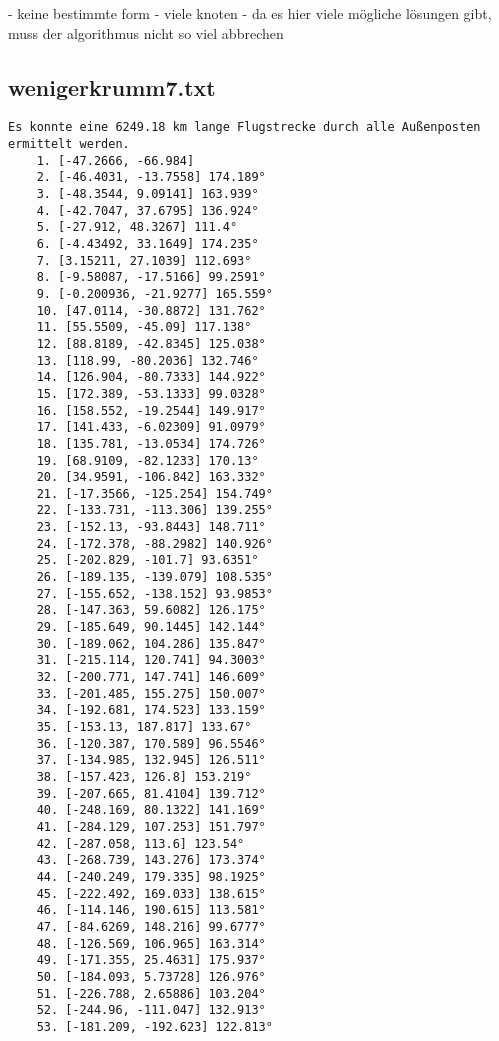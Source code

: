 \documentclass[a4paper,10pt,ngerman]{scrartcl}
\begin{document}
    - keine bestimmte form
    - viele knoten
    - da es hier viele mögliche lösungen gibt, muss der algorithmus nicht so viel abbrechen

    \subsection{wenigerkrumm7.txt}\label{subsec:wenigerkrumm7.txt}

    \begin{lstlisting}[frame=single, title=Programmausgabe wenigerkrumm7.txt, breaklines=true,label={lst:lstlisting4}]
    Es konnte eine 6249.18 km lange Flugstrecke durch alle Außenposten ermittelt werden.
    1. [-47.2666, -66.984]
    2. [-46.4031, -13.7558] 174.189°
    3. [-48.3544, 9.09141] 163.939°
    4. [-42.7047, 37.6795] 136.924°
    5. [-27.912, 48.3267] 111.4°
    6. [-4.43492, 33.1649] 174.235°
    7. [3.15211, 27.1039] 112.693°
    8. [-9.58087, -17.5166] 99.2591°
    9. [-0.200936, -21.9277] 165.559°
    10. [47.0114, -30.8872] 131.762°
    11. [55.5509, -45.09] 117.138°
    12. [88.8189, -42.8345] 125.038°
    13. [118.99, -80.2036] 132.746°
    14. [126.904, -80.7333] 144.922°
    15. [172.389, -53.1333] 99.0328°
    16. [158.552, -19.2544] 149.917°
    17. [141.433, -6.02309] 91.0979°
    18. [135.781, -13.0534] 174.726°
    19. [68.9109, -82.1233] 170.13°
    20. [34.9591, -106.842] 163.332°
    21. [-17.3566, -125.254] 154.749°
    22. [-133.731, -113.306] 139.255°
    23. [-152.13, -93.8443] 148.711°
    24. [-172.378, -88.2982] 140.926°
    25. [-202.829, -101.7] 93.6351°
    26. [-189.135, -139.079] 108.535°
    27. [-155.652, -138.152] 93.9853°
    28. [-147.363, 59.6082] 126.175°
    29. [-185.649, 90.1445] 142.144°
    30. [-189.062, 104.286] 135.847°
    31. [-215.114, 120.741] 94.3003°
    32. [-200.771, 147.741] 146.609°
    33. [-201.485, 155.275] 150.007°
    34. [-192.681, 174.523] 133.159°
    35. [-153.13, 187.817] 133.67°
    36. [-120.387, 170.589] 96.5546°
    37. [-134.985, 132.945] 126.511°
    38. [-157.423, 126.8] 153.219°
    39. [-207.665, 81.4104] 139.712°
    40. [-248.169, 80.1322] 141.169°
    41. [-284.129, 107.253] 151.797°
    42. [-287.058, 113.6] 123.54°
    43. [-268.739, 143.276] 173.374°
    44. [-240.249, 179.335] 98.1925°
    45. [-222.492, 169.033] 138.615°
    46. [-114.146, 190.615] 113.581°
    47. [-84.6269, 148.216] 99.6777°
    48. [-126.569, 106.965] 163.314°
    49. [-171.355, 25.4631] 175.937°
    50. [-184.093, 5.73728] 126.976°
    51. [-226.788, 2.65886] 103.204°
    52. [-244.96, -111.047] 132.913°
    53. [-181.209, -192.623] 122.813°

\end{lstlisting}
\end{document}
